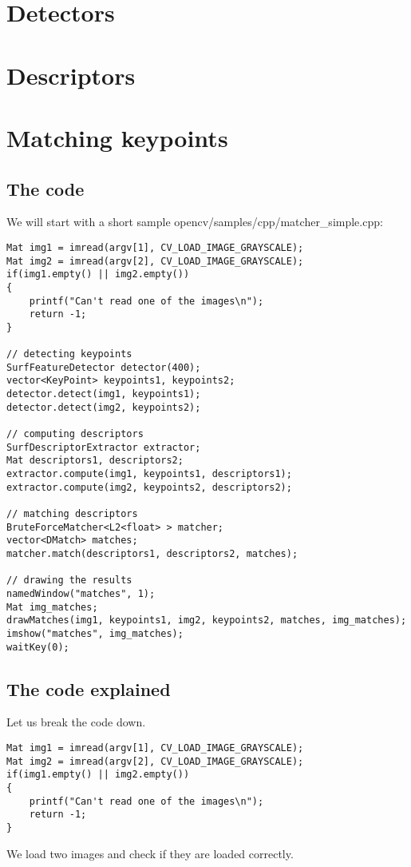 

\ifCpp
\section{Detectors}
\section{Descriptors}
\section{Matching keypoints}
\subsection{The code}
We will start with a short sample opencv/samples/cpp/matcher\_simple.cpp:

\begin{lstlisting}
Mat img1 = imread(argv[1], CV_LOAD_IMAGE_GRAYSCALE);
Mat img2 = imread(argv[2], CV_LOAD_IMAGE_GRAYSCALE);
if(img1.empty() || img2.empty())
{
	printf("Can't read one of the images\n");
	return -1;
}

// detecting keypoints
SurfFeatureDetector detector(400);
vector<KeyPoint> keypoints1, keypoints2;
detector.detect(img1, keypoints1);
detector.detect(img2, keypoints2);

// computing descriptors
SurfDescriptorExtractor extractor;
Mat descriptors1, descriptors2;
extractor.compute(img1, keypoints1, descriptors1);
extractor.compute(img2, keypoints2, descriptors2);

// matching descriptors
BruteForceMatcher<L2<float> > matcher;
vector<DMatch> matches;
matcher.match(descriptors1, descriptors2, matches);

// drawing the results
namedWindow("matches", 1);
Mat img_matches;
drawMatches(img1, keypoints1, img2, keypoints2, matches, img_matches);
imshow("matches", img_matches);
waitKey(0);
\end{lstlisting}

\subsection{The code explained}
Let us break the code down.
\begin{lstlisting}
Mat img1 = imread(argv[1], CV_LOAD_IMAGE_GRAYSCALE);
Mat img2 = imread(argv[2], CV_LOAD_IMAGE_GRAYSCALE);
if(img1.empty() || img2.empty())
{
	printf("Can't read one of the images\n");
	return -1;
}
\end{lstlisting}
We load two images and check if they are loaded correctly. 

